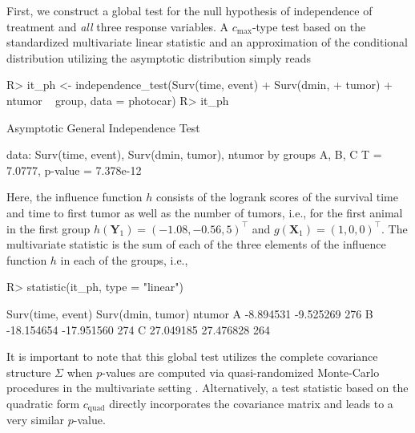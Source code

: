 \documentclass{article}
\newcommand{\X}{\mathbf{X}}
\newcommand{\Y}{\mathbf{Y}}
\newenvironment{Schunk}{}{}
\begin{document}
First, we construct a global test for the null hypothesis of independence
of treatment and \textit{all} three response variables. A
$c_\text{max}$-type test based on the standardized multivariate          
linear statistic and an approximation of the conditional distribution
utilizing the asymptotic distribution simply reads
\begin{Schunk}
\begin{Sinput}
R> it_ph <- independence_test(Surv(time, event) + Surv(dmin, 
+     tumor) + ntumor ~ group, data = photocar)
R> it_ph
\end{Sinput}
\begin{Soutput}
	Asymptotic General Independence Test

data:  Surv(time, event), Surv(dmin, tumor), ntumor by groups A, B, C 
T = 7.0777, p-value = 7.378e-12
\end{Soutput}
\end{Schunk}
Here, the influence function $h$ consists of the logrank scores of the survival
time and time to first tumor as well as the number of tumors, i.e., for the 
first animal in the first group $h(\Y_1) =
( -1.08,-0.56,5 )^\top$
and $g(\X_1) = (1, 0, 0)^\top$. The multivariate statistic is the sum of each of
the three elements of the influence function $h$ in each of the groups,
i.e.,
\begin{Schunk}
\begin{Sinput}
R> statistic(it_ph, type = "linear")
\end{Sinput}
\begin{Soutput}
  Surv(time, event) Surv(dmin, tumor) ntumor
A         -8.894531         -9.525269    276
B        -18.154654        -17.951560    274
C         27.049185         27.476828    264
\end{Soutput}
\end{Schunk}
It is important to note that this global test utilizes the complete
covariance structure $\Sigma$
when $p$-values are computed via quasi-randomized Monte-Carlo
procedures in the multivariate setting \citep{numerical-:1992}.
Alternatively, a test statistic based on the quadratic form $c_\text{quad}$
directly incorporates the covariance matrix and leads to a very similar 
$p$-value. 
\end{document}

